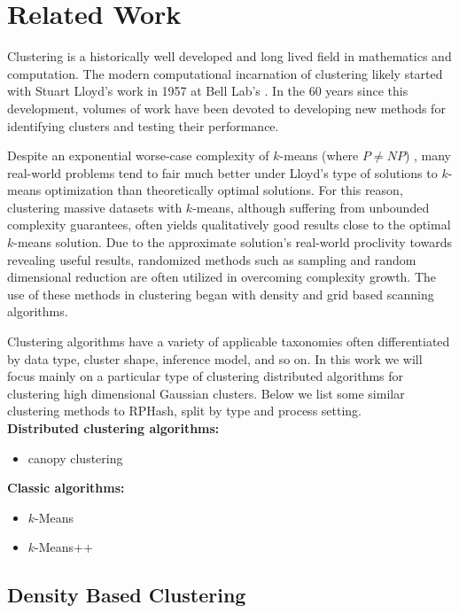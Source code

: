 
\chapter{Related Work}\label{related}

Clustering is a historically well developed and long lived field in mathematics and computation.  The modern
computational incarnation of clustering likely started with Stuart Lloyd's work in 1957 at Bell Lab's \cite{lloyd-57}.  In the 60 years
since this development, volumes of work have been devoted to developing new methods for identifying clusters and testing
their performance.

Despite an exponential worse-case complexity of $k$-means (where $P\neq NP$) \cite{Vattani}, many real-world problems tend
to fair much better under Lloyd's type of solutions to $k$-means optimization than theoretically optimal solutions.  For
this reason, clustering massive datasets with $k$-means, although suffering from unbounded complexity guarantees, often
yields qualitatively good results close to the optimal $k$-means solution.  Due to the approximate solution's real-world
proclivity towards revealing useful results, randomized methods such as sampling and random dimensional reduction are
often utilized in overcoming complexity growth.  The use of these methods in clustering began with density and grid
based scanning algorithms.

Clustering algorithms have a variety of applicable taxonomies often differentiated by data type, cluster shape,
inference model, and so on.  In this work we will focus mainly on a particular type of clustering distributed algorithms
for clustering high dimensional Gaussian clusters. Below we list some similar clustering methods to RPHash, split by type
and process setting.\\
\noindent
\textbf{Distributed clustering algorithms:}
\begin{itemize}
 \item canopy clustering \cite{mccallum}
\end{itemize}

\noindent
\textbf{Classic algorithms:}
\begin{itemize}
 \item $k$-Means \cite{Hartigan}
 \item $k$-Means++ \cite{arthur-07}
\end{itemize}

\section{Density Based Clustering}

